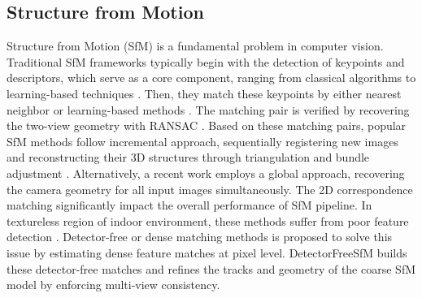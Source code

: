 \subsection{Structure from Motion}

Structure from Motion (SfM) is a fundamental problem in computer vision. Traditional SfM frameworks typically begin with the detection of keypoints and descriptors, which serve as a core component, ranging from classical algorithms \cite{SIFT} to learning-based techniques \cite{detone2018superpoint,sarlin2020superglue,revaud2019r2d2}. Then, they match these keypoints by either nearest neighbor \cite{schonberger2016structure} or learning-based methods \cite{sarlin2020superglue}. The matching pair is verified by recovering the two-view geometry \cite{hartley2003multiple} with RANSAC \cite{RANSAC}. Based on these matching pairs, popular SfM methods \cite{schonberger2016structure,moulon2017openmvg,sweeney2015theia} follow incremental approach, sequentially registering new images and reconstructing their 3D structures through triangulation \cite{hartley2003multiple} and bundle adjustment \cite{Bundleadjustment}. Alternatively, a recent work \cite{GLOMAP} employs a global approach, recovering the camera geometry for all input images simultaneously. The 2D correspondence matching significantly impact the overall performance of SfM pipeline. In textureless region of indoor environment, these methods suffer from poor feature detection \cite{he2024detector}. Detector-free or dense matching methods  \cite{sun2021loftr,edstedt2023dkm,edstedt2024roma} is proposed to solve this issue by estimating dense feature matches at pixel level. DetectorFreeSfM \cite{he2024detector} builds these detector-free matches \cite{sun2021loftr} and refines the tracks and geometry of
the coarse SfM model by enforcing multi-view consistency. 

